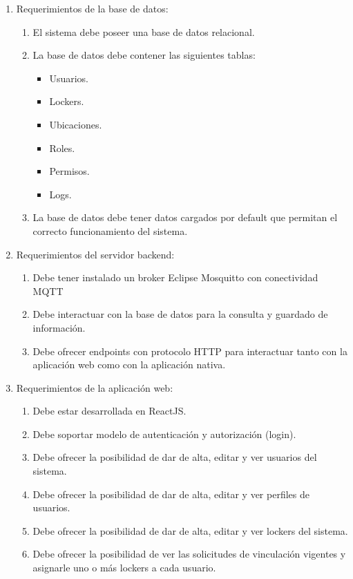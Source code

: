 \documentclass[
11pt, %
]{charter}
\begin{document}
\begin{enumerate}
	\item Requerimientos de la base de datos:
		\begin{enumerate}
			\item El sistema debe poseer una base de datos relacional.
			\item La base de datos debe contener las siguientes tablas:
				\begin{itemize}
					\item Usuarios.
					\item Lockers.
					\item Ubicaciones.
				    \item Roles.
					\item Permisos.
					\item Logs.
				\end{itemize}
			\item La base de datos debe tener datos cargados por default que permitan el correcto funcionamiento del sistema.
		\end{enumerate}
	\item Requerimientos del servidor backend:
		\begin{enumerate}
			\item Debe tener instalado un broker Eclipse Mosquitto con conectividad MQTT
			\item Debe interactuar con la base de datos para la consulta y guardado de información.
			\item Debe ofrecer endpoints con protocolo HTTP para interactuar tanto con la aplicación web como con la aplicación nativa.
		\end{enumerate}
	\item Requerimientos de la aplicación web:
		\begin{enumerate}
			\item Debe estar desarrollada en ReactJS.
			\item Debe soportar modelo de autenticación y autorización (login).
			\item Debe ofrecer la posibilidad de dar de alta, editar y ver usuarios del sistema.
			\item Debe ofrecer la posibilidad de dar de alta, editar y ver perfiles de usuarios.
			\item Debe ofrecer la posibilidad de dar de alta, editar y ver lockers del sistema.
			\item Debe ofrecer la posibilidad de ver las solicitudes de vinculación vigentes y asignarle uno o más lockers a cada usuario.

\end{enumerate}
\end{enumerate}
\end{document}
